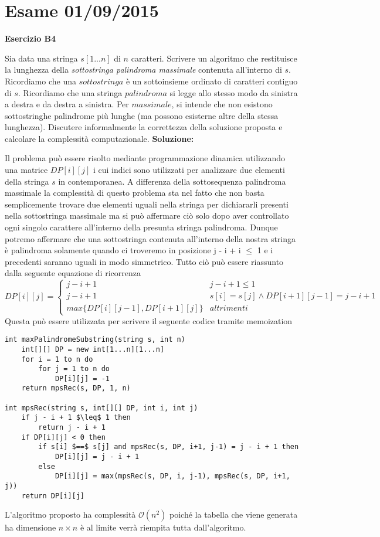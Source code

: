 \documentclass[../cheatSheetAlgoritmi.tex]{subfiles}
\begin{document}
\section{Esame 01/09/2015}
\textbf{Esercizio B4}

Sia data una stringa $s[1...n]$ di $n$ caratteri. Scrivere un algoritmo che restituisce la lunghezza della \emph{sottostringa palindroma massimale} contenuta all'interno di $s$. Ricordiamo che una $sottostringa$ è un sottoinsieme ordinato di caratteri contiguo di $s$. Ricordiamo che una stringa $palindroma$ si legge allo stesso modo da sinistra a destra e da destra a sinistra. Per $massimale$, si intende che non esistono sottostringhe palindrome più lunghe (ma possono esisterne altre della stessa lunghezza). Discutere informalmente la correttezza della soluzione proposta e calcolare la complessità computazionale.
\textbf{Soluzione:}

Il problema può essere risolto mediante programmazione dinamica utilizzando una matrice $DP[i][j]$ i cui indici sono utilizzati per analizzare due elementi della stringa $s$ in contemporanea. A differenza della sottosequenza palindroma massimale la complessità di questo problema sta nel fatto che non basta semplicemente trovare due elementi uguali nella stringa per dichiararli presenti nella sottostringa massimale ma si può affermare ciò solo dopo aver controllato ogni singolo carattere all'interno della presunta stringa palindroma. Dunque potremo affermare che una sottostringa contenuta all'interno della nostra stringa è palindroma solamente quando ci troveremo in posizione j - i + i $\leq$ 1 e i precedenti saranno uguali in modo simmetrico. Tutto ciò può essere riassunto dalla seguente equazione di ricorrenza
\begin{equation*}
  	DP[i][j]=\begin{cases}
  		j - i + 1 & \text{$j - i + 1 \leq 1$}\\
  		j - i + 1 & \text{$s[i] = s[j] \land DP[i+1][j-1] = j - i + 1$}\\
  		max\{DP[i][j-1], DP[i+1][j]\} & \text{$altrimenti$}
  	\end{cases}
\end{equation*}
Questa può essere utilizzata per scrivere il seguente codice tramite memoization
\begin{lstlisting}[caption=Sottostringa Palindroma Massimale]
int maxPalindromeSubstring(string s, int n)
	int[][] DP = new int[1...n][1...n]
	for i = 1 to n do
		for j = 1 to n do
			DP[i][j] = -1
	return mpsRec(s, DP, 1, n)
	
int mpsRec(string s, int[][] DP, int i, int j)
	if j - i + 1 $\leq$ 1 then
		return j - i + 1
	if DP[i][j] < 0 then
		if s[i] $==$ s[j] and mpsRec(s, DP, i+1, j-1) = j - i + 1 then
			DP[i][j] = j - i + 1
		else 
			DP[i][j] = max(mpsRec(s, DP, i, j-1), mpsRec(s, DP, i+1, j)) 
	return DP[i][j]
\end{lstlisting}
L'algoritmo proposto ha complessità $\mathcal{O}(n^{2})$ poiché la tabella che viene generata ha dimensione $n \times n$ è al limite verrà riempita tutta dall'algoritmo. 
\newpage
\end{document}
